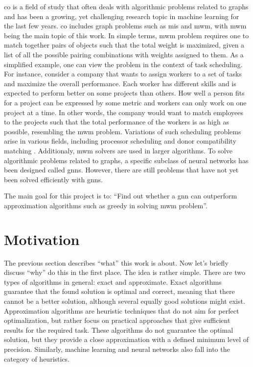\gls{co} is a field of study that often deals with algorithmic problems related to graphs and has been a growing, yet challenging research topic in machine learning for the last few years. \gls{co} includes graph problems such as \gls{mis} and \gls{mwm}, with \gls{mwm} being the main topic of this work. In simple terms, \gls{mwm} problem requires one to match together pairs of objects such that the total weight is maximized, given a list of all the possible pairing combinations with weights assigned to them. As a simplified example, one can view the problem in the context of task scheduling. For instance, consider a company that wants to assign workers to a set of tasks and maximize the overall performance. Each worker has different skills and is expected to perform better on some projects than others. How well a person fits for a project can be expressed by some metric and workers can only work on one project at a time. In other words, the company would want to match employees to the projects such that the total performance of the workers is as high as possible, resembling the \gls{mwm} problem. Variations of such scheduling problems arise in various fields, including processor scheduling \cite{processschedule} and donor compatibility matching \cite{ROTH2005151}. Additionaly, \gls{mwm} solvers are used in larger algorithms. To solve algorithmic problems related to graphs, a specific subclass of neural networks has been designed called \gls{gnn}s. However, there are still problems that have not yet been solved efficiently with \gls{gnn}s. 

The main goal for this project is to: “Find out whether a \gls{gnn} can outperform approximation algorithms such as greedy in solving \gls{mwm} problem”. 

\section{Motivation}

The previous section describes “what” this work is about. Now let's briefly discuss “why” do this in the first place. The idea is rather simple. There are two types of algorithms in general: exact and approximate. Exact algorithms guarantee that the found solution is optimal and correct, meaning that there cannot be a better solution, although several equally good solutions might exist. Approximation algorithms are heuristic techniques that do not aim for perfect optimalization, but rather focus on practical approaches that give sufficient results for the required task. These algorithms do not guarantee the optimal solution, but they provide a close approximation with a defined minimum level of precision. Similarly, machine learning and neural networks also fall into the category of heuristics.

